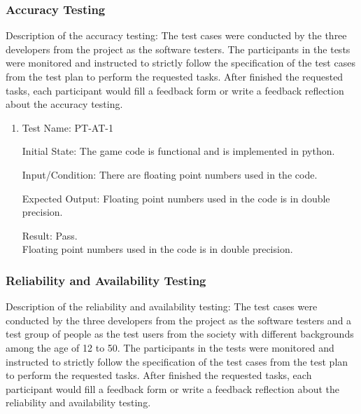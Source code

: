 \documentclass[12pt, titlepage]{article}
\begin{document}
\subsubsection{Accuracy Testing}
Description of the accuracy testing: The test cases were conducted by the three developers from the project as the software testers. The participants in the tests were monitored and instructed to strictly follow the specification of the test cases from the test plan to perform the requested tasks. After finished the requested tasks, each participant would fill a feedback form or write a feedback reflection about the accuracy testing.

\begin{enumerate}

\item{Test Name: PT-AT-1\\}

Initial State: The game code is functional and is implemented in python.

Input/Condition: There are floating point numbers used in the code.

Expected Output: Floating point numbers used in the code is in double precision.

Result: Pass. \\Floating point numbers used in the code is in double precision.

\end{enumerate}

\subsubsection{Reliability and Availability Testing}
Description of the reliability and availability testing: The test cases were conducted by the three developers from the project as the software testers and a test group of people as the test users from the society with different backgrounds among the age of 12 to 50. The participants in the tests were monitored and instructed to strictly follow the specification of the test cases from the test plan to perform the requested tasks. After finished the requested tasks, each participant would fill a feedback form or write a feedback reflection about the reliability and availability testing.
\end{document}
